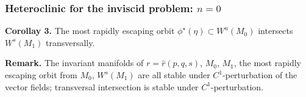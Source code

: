 \documentclass{beamer}
\def\blue{\color{blue}}
\begin{document}
\begin{frame}
 \frametitle{Heteroclinic for the inviscid problem: $n=0$}
 {\bf Corollay 3.} The most rapidly escaping orbit $\phi^\star(\eta)\subset W^u(M_0)$ intersects $W^s(M_1)$ transversally.
   \begin{figure}
  \centering
     \quad \quad \quad
 \end{figure}
 
 \vskip -8pt
{\bf Remark.} The invariant manifolds of {\blue $r=\hat{r}(p,q,s)$, $M_0$, $M_1$, the most rapidly escaping orbit from $M_0$, $W^s(M_1)$} are all stable under $C^1$-perturbation of the vector fields; transversal intersection is stable under $C^1$-perturbation. 
\end{frame}
\end{document}
